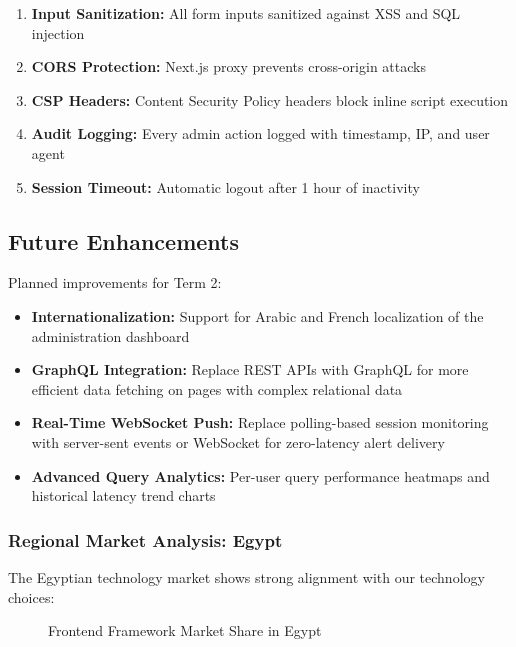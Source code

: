 \begin{enumerate}
    \item \textbf{Input Sanitization:} All form inputs sanitized against XSS and SQL injection
    \item \textbf{CORS Protection:} Next.js proxy prevents cross-origin attacks
    \item \textbf{CSP Headers:} Content Security Policy headers block inline script execution
    \item \textbf{Audit Logging:} Every admin action logged with timestamp, IP, and user agent
    \item \textbf{Session Timeout:} Automatic logout after 1 hour of inactivity
\end{enumerate}

\subsection{Future Enhancements}

Planned improvements for Term 2:

\begin{itemize}
    \item \textbf{Internationalization:} Support for Arabic and French
          localization of the administration dashboard
    \item \textbf{GraphQL Integration:} Replace REST APIs with GraphQL for
          more efficient data fetching on pages with complex relational data
    \item \textbf{Real-Time WebSocket Push:} Replace polling-based session
          monitoring with server-sent events or WebSocket for zero-latency
          alert delivery
    \item \textbf{Advanced Query Analytics:} Per-user query performance
          heatmaps and historical latency trend charts
\end{itemize}

\subsubsection{Regional Market Analysis: Egypt}

The Egyptian technology market shows strong alignment with our technology choices:

\begin{figure}[H]
\centering
{}
\caption{Frontend Framework Market Share in Egypt}
\end{figure}

